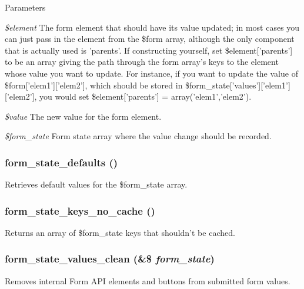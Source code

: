 \begin{DoxyParams}{Parameters}
\item[{\em \$element}]The form element that should have its value updated; in most cases you can just pass in the element from the \$form array, although the only component that is actually used is 'parents'. If constructing yourself, set \$element\mbox{[}'parents'\mbox{]} to be an array giving the path through the form array's keys to the element whose value you want to update. For instance, if you want to update the value of \$form\mbox{[}'elem1'\mbox{]}\mbox{[}'elem2'\mbox{]}, which should be stored in \$form\_\-state\mbox{[}'values'\mbox{]}\mbox{[}'elem1'\mbox{]}\mbox{[}'elem2'\mbox{]}, you would set \$element\mbox{[}'parents'\mbox{]} = array('elem1','elem2'). \item[{\em \$value}]The new value for the form element. \item[{\em \$form\_\-state}]Form state array where the value change should be recorded. \end{DoxyParams}
\hypertarget{group__form__api_ga398705411ef7b0f88e08253a56683987}{
\subsubsection[{form\_\-state\_\-defaults}]{\setlength{\rightskip}{0pt plus 5cm}form\_\-state\_\-defaults ()}}
\label{group__form__api_ga398705411ef7b0f88e08253a56683987}
Retrieves default values for the \$form\_\-state array. \hypertarget{group__form__api_gabffb5c6a1218bb14db316fe29c4e52af}{
\subsubsection[{form\_\-state\_\-keys\_\-no\_\-cache}]{\setlength{\rightskip}{0pt plus 5cm}form\_\-state\_\-keys\_\-no\_\-cache ()}}
\label{group__form__api_gabffb5c6a1218bb14db316fe29c4e52af}
Returns an array of \$form\_\-state keys that shouldn't be cached. \hypertarget{group__form__api_ga012a73101cc9e2bfbb9e9a41c4e0a723}{
\subsubsection[{form\_\-state\_\-values\_\-clean}]{\setlength{\rightskip}{0pt plus 5cm}form\_\-state\_\-values\_\-clean (\&\$ {\em form\_\-state})}}
\label{group__form__api_ga012a73101cc9e2bfbb9e9a41c4e0a723}
Removes internal Form API elements and buttons from submitted form values.

